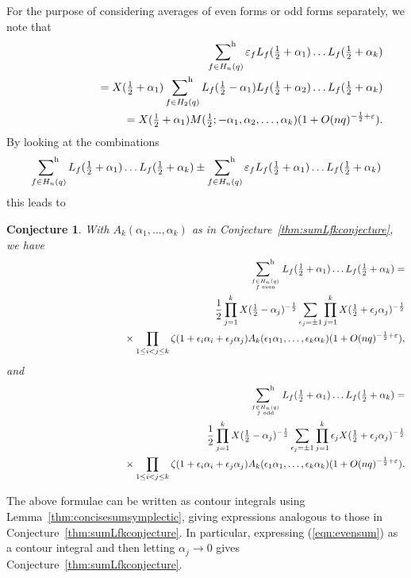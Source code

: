 \documentclass[12pt,letterpaper]{amsart}
\theoremstyle{plain}
\newtheorem{conjecture}[theorem]{Conjecture}
\theoremstyle{definition}
\theoremstyle{remark}
\numberwithin{equation}{subsection}
\numberwithin{theorem}{subsection}
\numberwithin{table}{subsection}
\newcommand{\ontop}[2]{\genfrac{}{}{0pt}{}{#1}{#2}}
\def\sumhar{\operatornamewithlimits{\sum\nolimits^h}}
\begin{document}
For the purpose of considering averages of even forms or odd forms
separately, we  note that
\begin{eqnarray}
&&\sumhar_{f\in H_n(q)}\varepsilon_f L_f(\tfrac12 +\alpha_1)\dots
L_f(\tfrac12 +\alpha_k) \\
&&\phantom{xxxxxxxxx}=X(\tfrac12+\alpha_1)\sumhar_{f\in H_2(q)}
L_f(\tfrac12 -\alpha_1)L_f(\tfrac12+\alpha_2)\dots L_f(\tfrac12
+\alpha_k)\nonumber\\
&&\phantom{xxxxxxxxxx}=X(\tfrac12+\alpha_1)M(\tfrac12;-\alpha_1,\alpha_2,\dots,\alpha_k)
(1+O(nq)^{-\frac12+\varepsilon}).\nonumber
\end{eqnarray}
By looking at the combinations \begin{equation} \sumhar_{f\in
H_n(q)} L_f(\tfrac12 +\alpha_1)\dots L_f(\tfrac12 +\alpha_k)\pm
\sumhar_{f\in H_n(q)}\varepsilon_f L_f(\tfrac12 +\alpha_1)\dots
L_f(\tfrac12 +\alpha_k) \end{equation} this leads to

 \begin{conjecture} \label{thm:Zfsumevenodd}
With $A_k(\alpha_1,\dots, \alpha_k)$ as in
Conjecture~\ref{thm:sumLfkconjecture}, we have
\begin{eqnarray}\label{eqn:evensum}
 & & \sumhar _{ \ontop{f\in H_n(q)}{f \text{ even} }}L_f(\tfrac12 +\alpha_1)\dots L_f(\tfrac12 +\alpha_k)=\nonumber \\
& &\phantom{xxxxxxxx}\frac{1}{2}\prod_{j=1}^k X(\tfrac12
-\alpha_j)^{-\frac12}\sum_{\epsilon_j=\pm 1 } \prod_{j=1}^k
X(\tfrac12 +\epsilon_j\alpha_j)^{-\frac12 } \nonumber \\
&   &\phantom{xxxxxxxxxxxxxxxxxxx}\times\prod_{1\le i<j\le k}
\zeta(1+\epsilon_i\alpha_i +\epsilon_j\alpha_j)
 A_k(\epsilon_1\alpha_1,\dots,\epsilon_k\alpha_k)(1 +O(nq)^{-\frac
12+\varepsilon}),
\end{eqnarray}
and
\begin{eqnarray} & &  \sumhar _{ \ontop{f\in H_n(q)}{f \text{ odd} }}L_f(\tfrac12 +\alpha_1)\dots L_f(\tfrac12 +\alpha_k)=\nonumber \\
&
&\phantom{xxxxxxxx}\frac{1}{2}\prod_{j=1}^kX(\tfrac12-\alpha_j)^{-\frac12}\sum_{\epsilon_j=\pm
1 } \prod_{j=1}^k\epsilon_j X(\tfrac12
+\epsilon_j\alpha_j)^{-\frac12
} \nonumber \\
&   &\phantom{xxxxxxxxxxxxxxxxxxx}\times\prod_{1\le i<j\le k}
\zeta(1+\epsilon_i\alpha_i
+\epsilon_j\alpha_j)A_k(\epsilon_1\alpha_1,\dots,\epsilon_k\alpha_k)
 (1 +O(nq)^{-\frac 12+\varepsilon}) .
\end{eqnarray}
\end{conjecture}
The above formulae can be written as contour integrals using
Lemma~\ref{thm:concisesumsymplectic}, giving expressions analogous
to those in Conjecture~\ref{thm:sumLfkconjecture}.  In particular,
expressing (\ref{eqn:evensum}) as a contour integral and then
letting $\alpha_j\to 0$ gives
Conjecture~\ref{thm:sumLfkconjecture}. 
\end{document}

